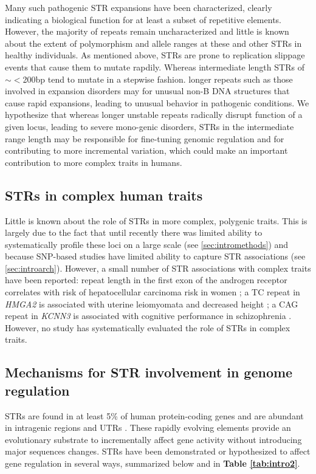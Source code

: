 Many such pathogenic STR expansions have been characterized, clearly indicating a biological function for at least a subset of repetitive elements. However, the majority of repeats remain uncharacterized and little is known about the extent of polymorphism and allele ranges at these and other STRs in healthy individuals. As mentioned above, STRs are prone to replication slippage events that cause them to mutate rapdily. Whereas intermediate length STRs of $\sim<$200bp tend to mutate in a stepwise fashion. longer repeats such as those involved in expansion disorders may for unusual non-B DNA structures \cite{KozlowskiSobczakKrzyzosiak2010} that cause rapid expansions, leading to unusual behavior in pathogenic conditions. We hypothesize that whereas longer unstable repeats radically disrupt function of a given locus, leading to severe mono-genic disorders, STRs in the intermediate range length may be responsible for fine-tuning genomic regulation and for contributing to more incremental variation, which could make an important contribution to more complex traits in humans.

\subsection{STRs in complex human traits}
Little is known about the role of STRs in more complex, polygenic traits. This is largely due to the fact that until recently there was limited ability to systematically profile these loci on a large scale (see \ref{sec:intromethods}) and because SNP-based studies have limited ability to capture STR associations (see \ref{sec:introarch}). However, a small number of STR associations with complex traits have been reported: repeat length in the first exon of the androgen receptor correlates with risk of hepatocellular carcinoma risk in women \cite{YuYangYangEtAl2002}; a TC repeat in \emph{HMGA2} is associated with uterine leiomyomata and decreased height \cite{HodgeTCuencoHuyckEtAl2009}; a CAG repeat in \emph{KCNN3} is associated with cognitive performance in schizophrenia \cite{GrubeGerchenAdamcioEtAl2011}. However, no study has systematically evaluated the role of STRs in complex traits.

\subsection{Mechanisms for STR involvement in genome regulation}
STRs are found in at least 5\% of human protein-coding genes \cite{ODushlaineEdwardsParkEtAl2005} and are abundant in intragenic regions and UTRs \cite{LiKorolFahimaEtAl2004}. These rapidly evolving elements provide an evolutionary substrate to incrementally affect gene activity without introducing major sequences changes. STRs have been demonstrated or hypothesized to affect gene regulation in several ways, summarized below and in \textbf{Table \ref{tab:intro2}}.

